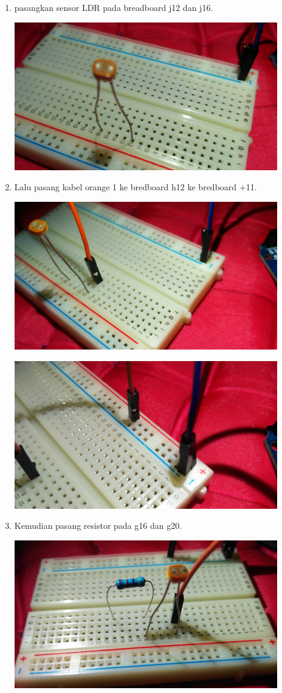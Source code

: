 \begin{enumerate}
	\break
	\item pasangkan sensor LDR pada breadboard j12 dan j16.
	\break
	\centerline{\includegraphics[width=0.9\textwidth]{figures/5.jpg}}
	\break
	\item Lalu pasang kabel orange 1 ke bredboard h12 ke bredboard +11.
	\break
	\centerline{\includegraphics[width=0.9\textwidth]{figures/6.jpg}}
	\break
	\centerline{\includegraphics[width=0.9\textwidth]{figures/7.jpg}}
	\break
	\item  Kemudian pasang resistor pada g16 dan g20.
	\break
	\centerline{\includegraphics[width=0.9\textwidth]{figures/8.jpg}}

\end{enumerate}
